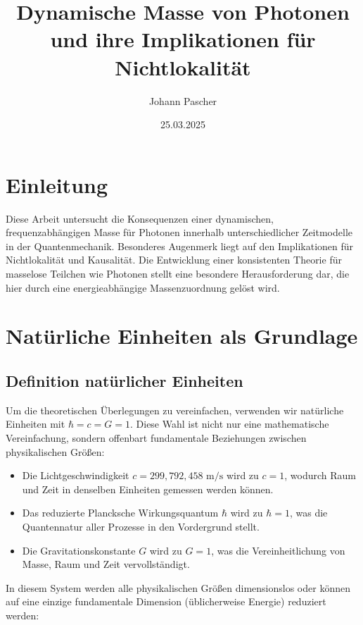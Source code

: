 \documentclass[a4paper,12pt]{article}
\begin{document}
	
	\title{Dynamische Masse von Photonen und ihre Implikationen für Nichtlokalität}
	\author{Johann Pascher}
	\date{25.03.2025}
	\maketitle
	
	\tableofcontents %
	\newpage %
	
	\section{Einleitung}
	Diese Arbeit untersucht die Konsequenzen einer dynamischen, frequenzabhängigen Masse für Photonen innerhalb unterschiedlicher Zeitmodelle in der Quantenmechanik. Besonderes Augenmerk liegt auf den Implikationen für Nichtlokalität und Kausalität. Die Entwicklung einer konsistenten Theorie für masselose Teilchen wie Photonen stellt eine besondere Herausforderung dar, die hier durch eine energieabhängige Massenzuordnung gelöst wird.
	
	\section{Natürliche Einheiten als Grundlage}
	\subsection{Definition natürlicher Einheiten}
	Um die theoretischen Überlegungen zu vereinfachen, verwenden wir natürliche Einheiten mit $\hbar = c = G = 1$. Diese Wahl ist nicht nur eine mathematische Vereinfachung, sondern offenbart fundamentale Beziehungen zwischen physikalischen Größen:
	
	\begin{itemize}
		\item Die Lichtgeschwindigkeit $c = 299{,}792{,}458 \text{ m/s}$ wird zu $c = 1$, wodurch Raum und Zeit in denselben Einheiten gemessen werden können.
		\item Das reduzierte Plancksche Wirkungsquantum $\hbar$ wird zu $\hbar = 1$, was die Quantennatur aller Prozesse in den Vordergrund stellt.
		\item Die Gravitationskonstante $G$ wird zu $G = 1$, was die Vereinheitlichung von Masse, Raum und Zeit vervollständigt.
	\end{itemize}
	
	In diesem System werden alle physikalischen Größen dimensionslos oder können auf eine einzige fundamentale Dimension (üblicherweise Energie) reduziert werden:
	
\end{document}
